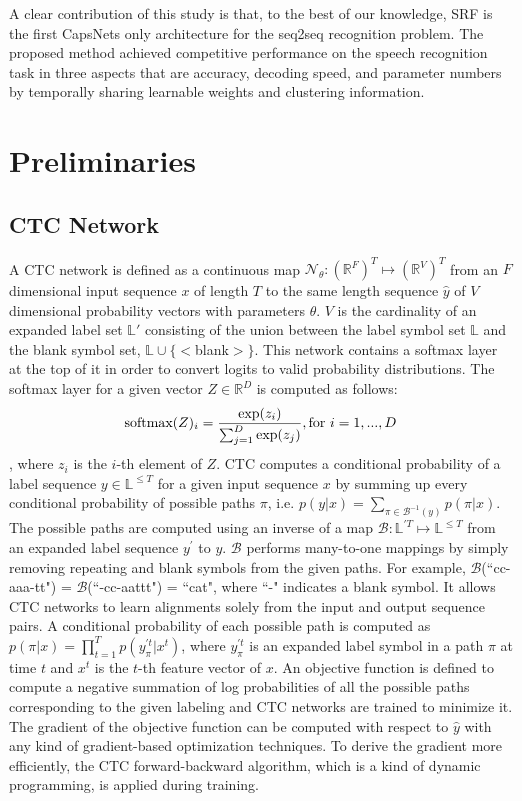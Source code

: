 \documentclass[review]{elsarticle}
\begin{document}
A clear contribution of this study is that, to the best of our knowledge, SRF is the first CapsNets only architecture for the seq2seq recognition problem. 
The proposed method achieved competitive performance on the speech recognition task in three aspects that are accuracy, decoding speed, and parameter numbers by temporally sharing learnable weights and clustering information.

\section{Preliminaries}
\subsection{CTC Network}
A CTC network \citep{DBLP:conf/icml/GravesFGS06} is defined as a continuous map \(\mathcal{N}_\theta: (\mathbb{R}^F)^T \mapsto (\mathbb{R}^{V})^T\) from an \(F\) dimensional input sequence \(x\) of length \(T\) to the same length sequence \(\hat{y}\) of \(V\) dimensional probability vectors with parameters \(\theta\).
\(V\) is the cardinality of an expanded label set \(\mathbb{L}'\) consisting of the union between the label symbol set \(\mathbb{L}\) and the blank symbol set, \(\mathbb{L} \cup \{<\)blank\(>\}\).
This network contains a softmax layer at the top of it in order to convert logits to valid probability distributions.
The softmax layer for a given vector \(Z \in \mathbb{R}^D\) is computed as follows:
\begin{equation}
\text{softmax}(Z)_i = {{\exp(z_i)} \over {\sum^D_{j=1} \exp(z_{j})}}, \text{for } i=1,...,D
\label{eq:softmax}
\end{equation}
, where \(z_i\) is the \(i\)-th element of \(Z\).
CTC computes a conditional probability of a label sequence \(y \in \mathbb{L} ^{\leq T}\) for a given input sequence \(x\) by summing up every conditional probability of possible paths \(\pi\), i.e. \(p(y|x) = \sum_{\pi \in \mathcal{B}^{-1}(y)} p(\pi|x)\).
The possible paths are computed using an inverse of a map \(\mathcal{B}: \mathbb{L}^{\prime T} \mapsto \mathbb{L}^{\leq T}\) from an expanded label sequence \(y^\prime\) to \(y\).
\(\mathcal{B}\) performs many-to-one mappings by simply removing repeating and blank symbols from the given paths.
For example, \(\mathcal{B}\)(``cc-aaa-tt") = \(\mathcal{B}\)(``-cc-aattt") = ``cat", where ``-" indicates a blank symbol.
It allows CTC networks to learn alignments solely from the input and output sequence pairs.
A conditional probability of each possible path is computed as \(p(\pi|x)=\prod_{t=1}^T p(y^{\prime t}_\pi |x^t)\), where \(y^{\prime t}_\pi\) is an expanded label symbol in a path \(\pi\) at time \(t\) and \(x^t\) is the \(t\)-th feature vector of \(x\).
An objective function is defined to compute a negative summation of log probabilities of all the possible paths corresponding to the given labeling and CTC networks are trained to minimize it.
The gradient of the objective function can be computed with respect to \(\hat{y}\) with any kind of gradient-based optimization techniques.
To derive the gradient more efficiently, the CTC forward-backward algorithm, which is a kind of dynamic programming, is applied during training.
\end{document}
